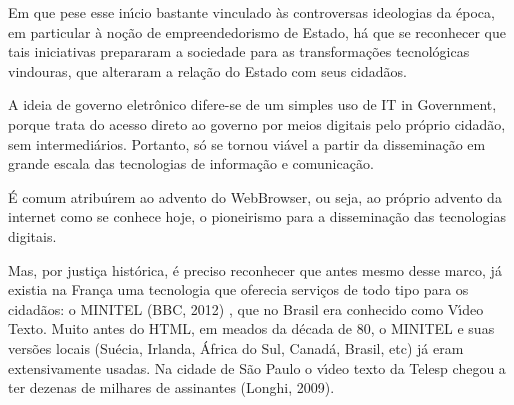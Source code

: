 \documentclass[
12pt,		%
openright,	%
twoside,  %
a4paper,			%
chapter=TITLE,		%
english,			%
french,				%
spanish,			%
brazil				%
]{USPSC-classe/USPSC}
\begin{document}
Em que pese esse in\'{\i}cio bastante vinculado \`as controversas ideologias da \'epoca, em particular \`a no\c{c}\~ao de \textquotedbl empreendedorismo de Estado\textquotedbl , h\'a que se reconhecer que tais iniciativas prepararam a sociedade para as transforma\c{c}\~oes tecnol\'ogicas vindouras, que alteraram a rela\c{c}\~ao do Estado com seus cidad\~aos.




A ideia de governo eletr\^onico difere-se de um simples uso de \textquotedbl IT in Government\textquotedbl , porque trata do acesso direto ao governo por meios digitais pelo pr\'oprio cidad\~ao, sem intermedi\'arios. Portanto, s\'o se tornou vi\'avel a partir da dissemina\c{c}\~ao em grande escala das tecnologias de informa\c{c}\~ao e comunica\c{c}\~ao.




\'E comum atribu\'{\i}rem ao advento do WebBrowser, ou seja, ao pr\'oprio advento da internet como se conhece hoje, o pioneirismo para a dissemina\c{c}\~ao das tecnologias digitais.




Mas, por justi\c{c}a hist\'orica, \'e preciso reconhecer que antes mesmo desse marco, j\'a existia na Fran\c{c}a uma tecnologia que oferecia servi\c{c}os de todo tipo para os cidad\~aos: o MINITEL  (BBC, 2012) , que no Brasil era conhecido como V\'{\i}deo Texto. Muito antes do HTML, em meados da d\'ecada de 80, o MINITEL e suas vers\~oes locais (Su\'ecia, Irlanda, \'Africa do Sul, Canad\'a, Brasil, etc) j\'a eram extensivamente usadas. Na cidade de S\~ao Paulo o v\'{\i}deo texto da Telesp chegou a ter dezenas de milhares de assinantes  (Longhi, 2009).
\end{document}
